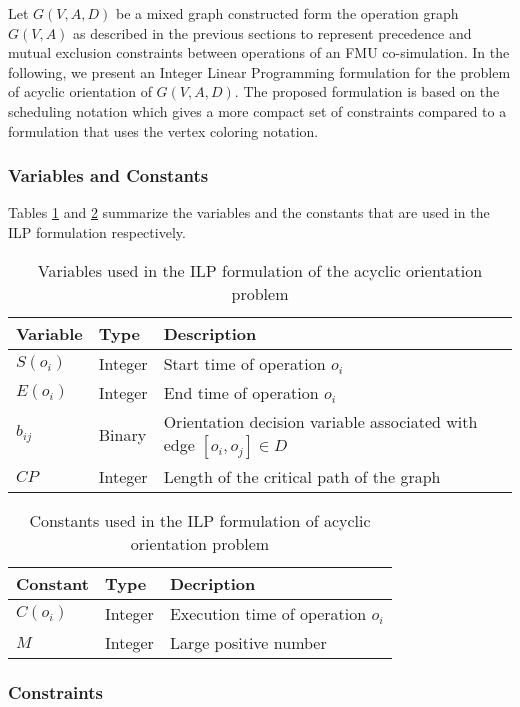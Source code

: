 Let $G(V,A,D)$ be a mixed graph constructed form the operation graph $G(V,A)$ as described in the previous sections to represent precedence and mutual exclusion constraints between operations of an FMU co-simulation. In the following, we present an Integer Linear Programming formulation for the problem of acyclic orientation of $G(V,A,D)$. The proposed formulation is based on the scheduling notation which gives a more compact set of constraints compared to a formulation that uses the vertex coloring notation.

\subsubsection{Variables and Constants}

Tables \ref{table:varilporient} and \ref{table:consilporient} summarize the variables and the constants that are used in the ILP formulation respectively.

\begin{table}[!htbp]
\caption{Variables used in the ILP formulation of the acyclic orientation problem}
\centering
\label{table:varilporient}
\begin{tabular}{l l l}
\toprule
Variable & Type & Description  \\
\midrule
 $S(o_i)$ & Integer & Start time of operation $o_i$\\
 $E(o_i)$ & Integer & End time of operation $o_i$\\
 $b_{ij}$ & Binary & Orientation decision variable associated with edge $[o_i,o_j] \in D$\\
 $CP$ & Integer & Length of the critical path of the graph\\
\bottomrule
\end{tabular}
\end{table}

\begin{table}[!htbp]
\caption{Constants used in the ILP formulation of acyclic orientation problem}
\centering
\label{table:consilporient}
\begin{tabular}{l l l}
\toprule
Constant & Type & Decription\\
\midrule
 $C(o_i)$ & Integer & Execution time of operation $o_i$\\
 $M$ & Integer & Large positive number\\
\bottomrule
\end{tabular}
\end{table}

\subsubsection{Constraints}

